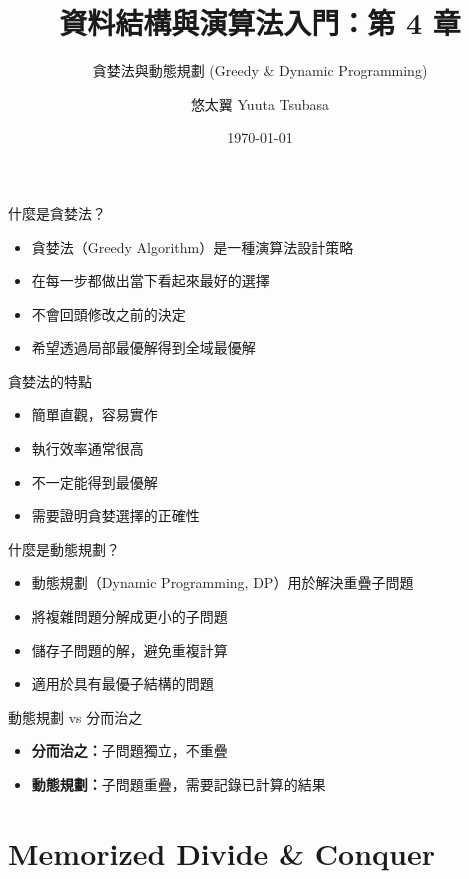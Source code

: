 \documentclass{beamer}
\begin{document}
\title{資料結構與演算法入門：第 4 章}
\subtitle{貪婪法與動態規劃 (Greedy \& Dynamic Programming)}
\author{悠太翼 Yuuta Tsubasa}
\date{\today}

\frame{\titlepage}

\begin{frame}{什麼是貪婪法？}
\begin{itemize}
    \item 貪婪法（Greedy Algorithm）是一種演算法設計策略
    \item 在每一步都做出當下看起來最好的選擇
    \item 不會回頭修改之前的決定
    \item 希望透過局部最優解得到全域最優解
\end{itemize}

\vspace{1em}
\begin{block}{貪婪法的特點}
\begin{itemize}
    \item 簡單直觀，容易實作
    \item 執行效率通常很高
    \item 不一定能得到最優解
    \item 需要證明貪婪選擇的正確性
\end{itemize}
\end{block}
\end{frame}

\begin{frame}{什麼是動態規劃？}
\begin{itemize}
    \item 動態規劃（Dynamic Programming, DP）用於解決重疊子問題
    \item 將複雜問題分解成更小的子問題
    \item 儲存子問題的解，避免重複計算
    \item 適用於具有最優子結構的問題
\end{itemize}

\vspace{1em}
\begin{block}{動態規劃 vs 分而治之}
\begin{itemize}
    \item \textbf{分而治之：}子問題獨立，不重疊
    \item \textbf{動態規劃：}子問題重疊，需要記錄已計算的結果
\end{itemize}
\end{block}
\end{frame}

\section{Memorized Divide \& Conquer}
\end{document}
